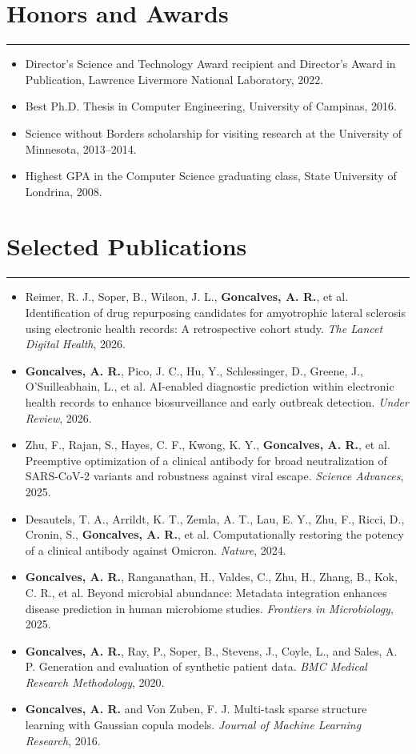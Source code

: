 \documentclass[10pt,letterpaper]{article}
\newcommand{\sectionrule}{\vspace{-0.1em}\hrule\vspace{0.25em}}
\begin{document}
	\section*{Honors and Awards}
	\sectionrule
	\begin{itemize}
		\item Director's Science and Technology Award recipient and Director's Award in Publication, Lawrence Livermore National Laboratory, 2022.
		\item Best Ph.D. Thesis in Computer Engineering, University of Campinas, 2016.
		\item Science without Borders scholarship for visiting research at the University of Minnesota, 2013--2014.
		\item Highest GPA in the Computer Science graduating class, State University of Londrina, 2008.
	\end{itemize}
	
	\section*{Selected Publications}
	\sectionrule
	\begin{itemize}[leftmargin=1.4em]
		\item Reimer, R. J., Soper, B., Wilson, J. L., \textbf{Goncalves, A. R.}, et al. Identification of drug repurposing candidates for amyotrophic lateral sclerosis using electronic health records: A retrospective cohort study. \textit{The Lancet Digital Health}, 2026.
		\item \textbf{Goncalves, A. R.}, Pico, J. C., Hu, Y., Schlessinger, D., Greene, J., O'Suilleabhain, L., et al. AI-enabled diagnostic prediction within electronic health records to enhance biosurveillance and early outbreak detection. \textit{Under Review}, 2026.
		\item Zhu, F., Rajan, S., Hayes, C. F., Kwong, K. Y., \textbf{Goncalves, A. R.}, et al. Preemptive optimization of a clinical antibody for broad neutralization of SARS-CoV-2 variants and robustness against viral escape. \textit{Science Advances}, 2025.
		\item Desautels, T. A., Arrildt, K. T., Zemla, A. T., Lau, E. Y., Zhu, F., Ricci, D., Cronin, S., \textbf{Goncalves, A. R.}, et al. Computationally restoring the potency of a clinical antibody against Omicron. \textit{Nature}, 2024.
		\item \textbf{Goncalves, A. R.}, Ranganathan, H., Valdes, C., Zhu, H., Zhang, B., Kok, C. R., et al. Beyond microbial abundance: Metadata integration enhances disease prediction in human microbiome studies. \textit{Frontiers in Microbiology}, 2025.
		\item \textbf{Goncalves, A. R.}, Ray, P., Soper, B., Stevens, J., Coyle, L., and Sales, A. P. Generation and evaluation of synthetic patient data. \textit{BMC Medical Research Methodology}, 2020.
		\item \textbf{Goncalves, A. R.} and Von Zuben, F. J. Multi-task sparse structure learning with Gaussian copula models. \textit{Journal of Machine Learning Research}, 2016.
	\end{itemize}
	
\end{document}
